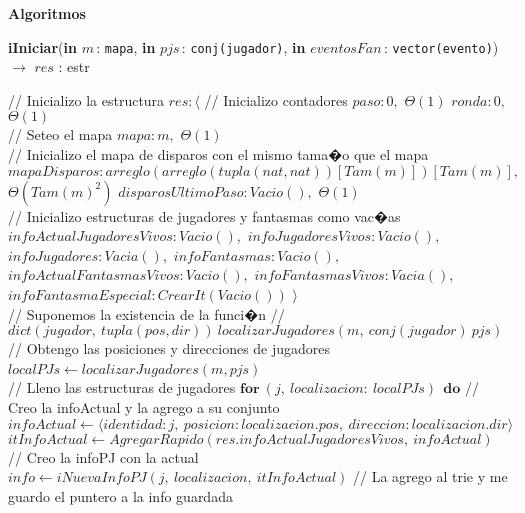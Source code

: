 \documentclass[a4paper,10pt]{article}
\let\TipoVariable=\texttt
\let\ModificadorArgumento=\textbf
\newcommand{\tab}{\hspace*{7mm}}
\newcommand{\In}[2]{\ModificadorArgumento{in} \ensuremath{#1}\,: \TipoVariable{#2}\xspace}
\newenvironment{Algoritmos}{%
  \vspace*{2ex}%
  \noindent\textbf{\Large Algoritmos}%
  \vspace*{2ex}%
}{}
\newcommand{\tuple}[1]{\langle #1 \rangle}
\begin{document}
{\begin{Algoritmos}
  \begin{algorithm}[H]{\textbf{iIniciar}(\In{m}{mapa}, \In{pjs}{conj(jugador)}, \In{eventosFan}{vector(evento)}) $\to$ $res$ : estr}
        \begin{algorithmic}[1]
        \State // Inicializo la estructura
        \State $res: \langle$
        \State \tab // Inicializo contadores
        \State \tab $paso : 0,$                     \Comment $\Theta(1)$
        \State \tab $ronda : 0,$                     \Comment $\Theta(1)$
        \\
        \State \tab // Seteo el mapa 
        \State \tab $mapa: m,$                     \Comment $\Theta(1)$
        \\
        \State \tab // Inicializo el mapa de disparos con el mismo tama�o que el mapa
        \State \tab $mapaDisparos: arreglo(arreglo(tupla(nat, nat))[Tam(m)])[Tam(m)],$ \Comment $\Theta(Tam(m)^2)$
        \State \tab $disparosUltimoPaso: Vacio(),$ \Comment $\Theta(1)$
        \\
        \State \tab // Inicializo estructuras de jugadores y fantasmas como vac�as
        \State \tab $infoActualJugadoresVivos: Vacio(),$
        \State \tab $infoJugadoresVivos: Vacio(),$
        \State \tab $infoJugadores: Vacia(),$
        \State \tab $infoFantasmas: Vacio(),$
        \State \tab $infoActualFantasmasVivos: Vacio(),$
        \State \tab $infoFantasmasVivos: Vacia(),$
        \State \tab $infoFantasmaEspecial: CrearIt(Vacio())$ %
        \State $\rangle$
        \\
        \State // Suponemos la existencia de la funci�n
        \State // $dict(jugador,\ tupla(pos, dir))\ localizarJugadores(m,\ conj(jugador)\ pjs)$ 
        \\
        \State // Obtengo las posiciones y direcciones de jugadores
        \State $localPJs \gets localizarJugadores(m, pjs)$ \
        \\
        \State // Lleno las estructuras de jugadores
        \State $\textbf{for} \ (j,\ localizacion : \ localPJs) \ \ \textbf{do}$
        \State \tab // Creo la infoActual y la agrego a su conjunto
        \State \tab $infoActual \gets \tuple{identidad: j,\ posicion: localizacion.pos,\ direccion: localizacion.dir}$
        \State \tab $itInfoActual \gets AgregarRapido(res.infoActualJugadoresVivos,\ infoActual)$
        \\
        \State \tab // Creo la infoPJ con la actual
        \State \tab $info \gets iNuevaInfoPJ(j,\ localizacion,\ itInfoActual)$
        \State \tab // La agrego al trie y me guardo el puntero a la info guardada

\end{algorithmic}
\end{algorithm}
\end{Algoritmos}}
\end{document}
